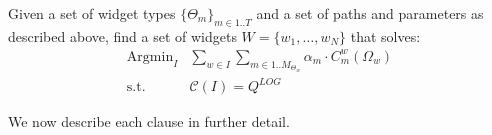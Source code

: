    \begin{problem}
   Given a set of widget types $\{\Theta_m\}_{m \in 1..T}$ and a set of paths and parameters as described above, find a set of widgets $W = \{w_1, \ldots, w_N\}$ that solves:
   \begin{equation*}
   \begin{split}
   \text{Argmin}_{I} & \sum_{w \in I} \sum_{m \in 1..M_{\Theta_w}} \alpha_m \cdot C_m^w(\Omega_w)\\
   \text{s.t.~~}  &   \mathcal{C}(I) = Q^{LOG}
   \end{split}
   \end{equation*}
   \end{problem}


















%
%

We now describe each clause in further detail.



